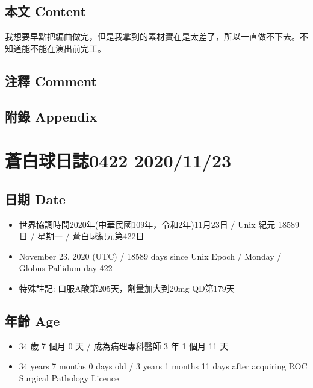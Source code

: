 \documentclass[a5paper, 11pt
]{book}
\providecommand{\tightlist}{%
  \setlength{\itemsep}{0pt}\setlength{\parskip}{0pt}}
\begin{document}
\hypertarget{ux672cux6587-content-73}{%
\subsection{本文 Content}\label{ux672cux6587-content-73}}

我想要早點把編曲做完，但是我拿到的素材實在是太差了，所以一直做不下去。不知道能不能在演出前完工。

\hypertarget{ux6ce8ux91cb-comment-73}{%
\subsection{注釋 Comment}\label{ux6ce8ux91cb-comment-73}}

\hypertarget{ux9644ux9304-appendix-73}{%
\subsection{附錄 Appendix}\label{ux9644ux9304-appendix-73}}

\hypertarget{ux84bcux767dux7403ux65e5ux8a8c0422-20201123}{%
\section{蒼白球日誌0422
2020/11/23}\label{ux84bcux767dux7403ux65e5ux8a8c0422-20201123}}

\hypertarget{ux65e5ux671f-date-74}{%
\subsection{日期 Date}\label{ux65e5ux671f-date-74}}

\begin{itemize}
\tightlist
\item
  世界協調時間2020年(中華民國109年，令和2年)11月23日 / Unix 紀元 18589
  日 / 星期一 / 蒼白球紀元第422日
\item
  November 23, 2020 (UTC) / 18589 days since Unix Epoch / Monday /
  Globus Pallidum day 422
\item
  特殊註記: 口服A酸第205天，劑量加大到20mg QD第179天
\end{itemize}

\hypertarget{ux5e74ux9f61-age-74}{%
\subsection{年齡 Age}\label{ux5e74ux9f61-age-74}}

\begin{itemize}
\tightlist
\item
  34 歲 7 個月 0 天 / 成為病理專科醫師 3 年 1 個月 11 天
\item
  34 years 7 months 0 days old / 3 years 1 months 11 days after
  acquiring ROC Surgical Pathology Licence
\end{itemize}
\end{document}
